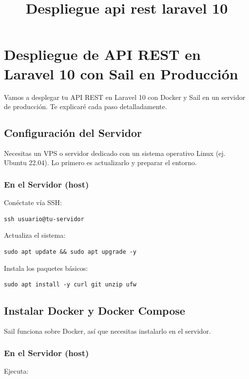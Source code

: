 \documentclass[11pt]{article}
\date{}
\title{Despliegue api rest laravel 10}
\begin{document}
\maketitle
\setcounter{tocdepth}{2}
\tableofcontents

\setlength\parindent{10pt}

\section{Despliegue de API REST en Laravel 10 con Sail en Producción}
\label{sec:orgf9dd177}

Vamos a desplegar tu API REST en Laravel 10 con Docker y Sail en un
servidor de producción. Te explicaré cada paso detalladamente.

\subsection{Configuración del Servidor}
\label{sec:org3932421}

Necesitas un VPS o servidor dedicado con un sistema operativo Linux
(ej. Ubuntu 22.04). Lo primero es actualizarlo y preparar el entorno.

\subsubsection*{En el Servidor (host)}
\label{sec:orgb0f901b}
Conéctate vía SSH:

\begin{verbatim}
ssh usuario@tu-servidor
\end{verbatim}

Actualiza el sistema:

\begin{verbatim}
sudo apt update && sudo apt upgrade -y
\end{verbatim}

Instala los paquetes básicos:

\begin{verbatim}
sudo apt install -y curl git unzip ufw
\end{verbatim}

\subsection{Instalar Docker y Docker Compose}
\label{sec:orge90b4ff}

Sail funciona sobre Docker, así que necesitas instalarlo en el
servidor.

\subsubsection*{En el Servidor (host)}
\label{sec:orgfc854c2}
Ejecuta:
\end{document}
